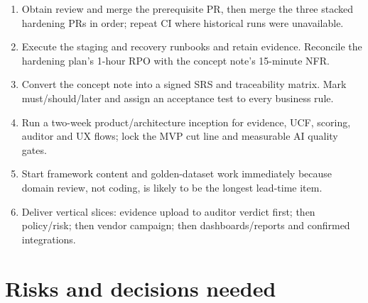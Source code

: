 \documentclass[11pt,a4paper]{article}
\begin{document}
\begin{enumerate}
  \item Obtain review and merge the prerequisite PR, then merge the three stacked
  hardening PRs in order; repeat CI where historical runs were unavailable.
  \item Execute the staging and recovery runbooks and retain evidence. Reconcile
  the hardening plan's 1-hour RPO with the concept note's 15-minute NFR.
  \item Convert the concept note into a signed SRS and traceability matrix. Mark
  must/should/later and assign an acceptance test to every business rule.
  \item Run a two-week product/architecture inception for evidence, UCF, scoring,
  auditor and UX flows; lock the MVP cut line and measurable AI quality gates.
  \item Start framework content and golden-dataset work immediately because domain
  review, not coding, is likely to be the longest lead-time item.
  \item Deliver vertical slices: evidence upload to auditor verdict first; then
  policy/risk; then vendor campaign; then dashboards/reports and confirmed
  integrations.
\end{enumerate}

\section{Risks and decisions needed}
\end{document}
